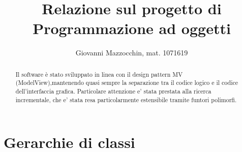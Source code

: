 \documentclass{article}
\begin{document}
\title{Relazione sul progetto di Programmazione ad oggetti}
\author{Giovanni Mazzocchin, mat. 1071619}
\maketitle

\begin{abstract}
Il software è stato sviluppato in linea con il design pattern MV (ModelView),mantenendo quasi sempre
la separazione tra il codice logico e il codice dell'interfaccia grafica.
Particolare attenzione e' stata prestata alla ricerca incrementale, che e' stata resa
particolarmente estensibile tramite funtori polimorfi.
\end{abstract}

\section{Gerarchie di classi}
\end{document}
